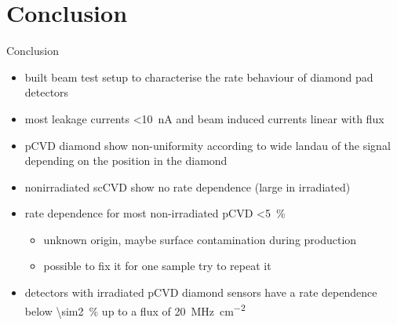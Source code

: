 \section{Conclusion}
\begin{frame}{Conclusion}

	\begin{minipage}[c][.7\textheight]{\textwidth}
		\begin{itemize}
			\itemfill
			\item built beam test setup to characterise the rate behaviour of diamond pad detectors
			\item most leakage currents \SI{<10}{\nano\ampere} and beam induced currents linear with flux
			\item pCVD diamond show non-uniformity according to wide landau of the signal depending on the position in the diamond
			\item nonirradiated scCVD show no rate dependence (large in irradiated)
			\item rate dependence for most non-irradiated pCVD \SI{<5}{\%}
			\begin{itemize}
				\item unknown origin, maybe surface contamination during production
				\item possible to fix it for one sample \ra try to repeat it\vspace*{5pt}
			\end{itemize}
			\item detectors with irradiated pCVD diamond sensors have a rate dependence below \SI{\sim2}{\%} up to a flux of \SI{20}{\mega\hertz\per \centi\meter^2}
		\end{itemize}
	\end{minipage}
	
\end{frame}
